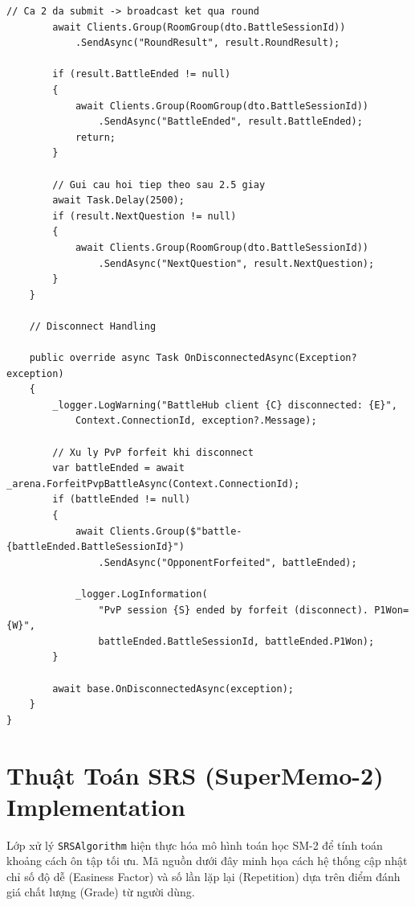 \begin{lstlisting}[caption={Doan ma xu ly logic chinh trong BattleHub (SignalR)}, label={lst:battlehub}]
        // Ca 2 da submit -> broadcast ket qua round
        await Clients.Group(RoomGroup(dto.BattleSessionId))
            .SendAsync("RoundResult", result.RoundResult);

        if (result.BattleEnded != null)
        {
            await Clients.Group(RoomGroup(dto.BattleSessionId))
                .SendAsync("BattleEnded", result.BattleEnded);
            return;
        }

        // Gui cau hoi tiep theo sau 2.5 giay
        await Task.Delay(2500);
        if (result.NextQuestion != null)
        {
            await Clients.Group(RoomGroup(dto.BattleSessionId))
                .SendAsync("NextQuestion", result.NextQuestion);
        }
    }

    // Disconnect Handling

    public override async Task OnDisconnectedAsync(Exception? exception)
    {
        _logger.LogWarning("BattleHub client {C} disconnected: {E}",
            Context.ConnectionId, exception?.Message);

        // Xu ly PvP forfeit khi disconnect
        var battleEnded = await _arena.ForfeitPvpBattleAsync(Context.ConnectionId);
        if (battleEnded != null)
        {
            await Clients.Group($"battle-{battleEnded.BattleSessionId}")
                .SendAsync("OpponentForfeited", battleEnded);

            _logger.LogInformation(
                "PvP session {S} ended by forfeit (disconnect). P1Won={W}",
                battleEnded.BattleSessionId, battleEnded.P1Won);
        }

        await base.OnDisconnectedAsync(exception);
    }
}
\end{lstlisting}

\section{Thuật Toán SRS (SuperMemo-2) Implementation}

Lớp xử lý \texttt{SRSAlgorithm} hiện thực hóa mô hình toán học SM-2 để tính toán khoảng cách ôn tập tối ưu. Mã nguồn dưới đây minh họa cách hệ thống cập nhật chỉ số độ dễ (Easiness Factor) và số lần lặp lại (Repetition) dựa trên điểm đánh giá chất lượng (Grade) từ người dùng.

